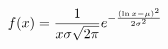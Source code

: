 \documentclass[preview]{standalone}
\begin{document}
\begin{align*}
\special{dvisvgm:raw <g id='unique000'>}f(x) = \frac{1}{x\sigma\sqrt{2\pi}} e^{-\frac{(\ln x - \mu)^2}{2\sigma^2}}\special{dvisvgm:raw </g>}
\end{align*}
\end{document}
